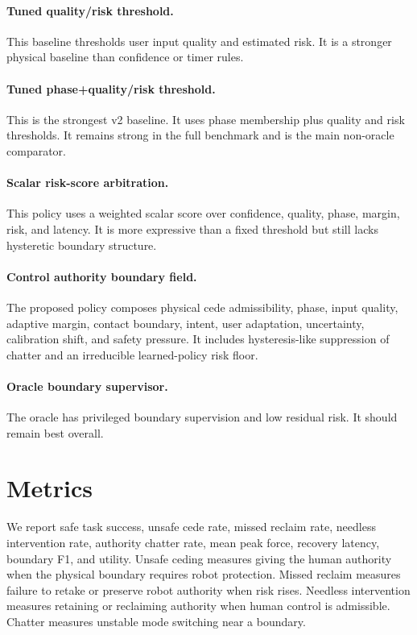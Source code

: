\documentclass{article}
\begin{document}
\paragraph{Tuned quality/risk threshold.}
This baseline thresholds user input quality and estimated risk. It is a stronger physical baseline than confidence or timer rules.

\paragraph{Tuned phase+quality/risk threshold.}
This is the strongest v2 baseline. It uses phase membership plus quality and risk thresholds. It remains strong in the full benchmark and is the main non-oracle comparator.

\paragraph{Scalar risk-score arbitration.}
This policy uses a weighted scalar score over confidence, quality, phase, margin, risk, and latency. It is more expressive than a fixed threshold but still lacks hysteretic boundary structure.

\paragraph{Control authority boundary field.}
The proposed policy composes physical cede admissibility, phase, input quality, adaptive margin, contact boundary, intent, user adaptation, uncertainty, calibration shift, and safety pressure. It includes hysteresis-like suppression of chatter and an irreducible learned-policy risk floor.

\paragraph{Oracle boundary supervisor.}
The oracle has privileged boundary supervision and low residual risk. It should remain best overall.

\section{Metrics}

We report safe task success, unsafe cede rate, missed reclaim rate, needless intervention rate, authority chatter rate, mean peak force, recovery latency, boundary F1, and utility. Unsafe ceding measures giving the human authority when the physical boundary requires robot protection. Missed reclaim measures failure to retake or preserve robot authority when risk rises. Needless intervention measures retaining or reclaiming authority when human control is admissible. Chatter measures unstable mode switching near a boundary.
\end{document}
